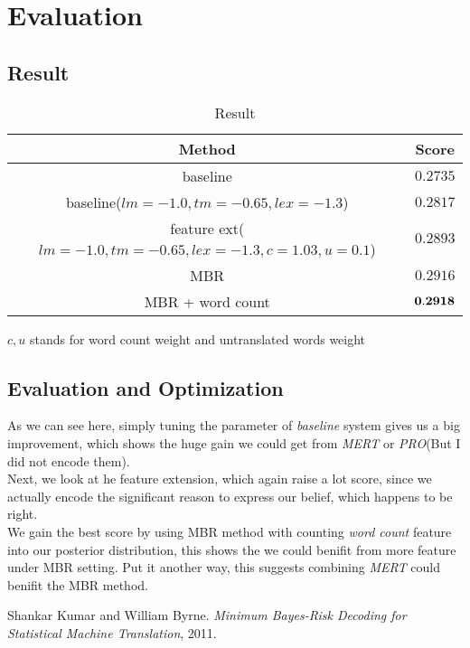 \documentclass[11pt]{article}
\begin{document}
\section{Evaluation} %
\label{sec:evaluation}
\subsection{Result} %
\label{sub:result}
\begin{table}[!htf]
\centering
\begin{tabular}{ | c | c |}
\hline
Method & Score\\
\hline
baseline & $0.2735$\\
\hline
baseline($lm = -1.0, tm = -0.65, lex = -1.3$) & $0.2817$ \\
\hline
feature ext($lm = -1.0, tm = -0.65, lex = -1.3, c = 1.03, u = 0.1$) & $0.2893$ \\
\hline
MBR & $0.2916$ \\
\hline
MBR + word count & $\bf{0.2918}$ \\
\hline
\end{tabular}
\caption{Result}
$c, u$ stands for word count weight and untranslated words weight 
\end{table}

\subsection{Evaluation and Optimization} %
\label{sub:evaluation_Optimization}
As we can see here, simply tuning the parameter of \textit{baseline} system gives us a big improvement, which shows the huge gain we could get from \textit{MERT} or \textit{PRO}(But I did not encode them).\\
Next, we look at he feature extension, which again raise a lot score, since we actually encode the significant reason to express our belief, which happens to be right.\\
We gain the best score by using MBR method with counting \textit{word count} feature into our posterior distribution, this shows the we could benifit from more feature under MBR setting. Put it another way, this suggests combining \textit{MERT} could benifit the MBR method.

\begin{thebibliography}{50}
 Shankar Kumar and William Byrne. \textsl{Minimum Bayes-Risk Decoding for Statistical Machine Translation}, 2011.

\end{thebibliography}
\end{document}
